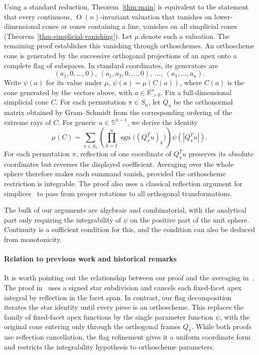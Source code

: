 \documentclass[11pt]{article}
\newcommand{\R}{\mathbb{R}}
\newcommand{\On}[1]{\operatorname{O}(#1)}
\newcommand{\sphere}[1]{\mathbb{S}^{#1}}
\DeclareMathOperator{\sgn}{sgn}
\begin{document}
Using a standard reduction, Theorem~\ref{thm:main} is equivalent 
to the statement that every continuous, $\On n$-invariant 
valuation that vanishes on lower-dimensional cones or cones containing a line, vanishes
on all simplicial cones (Theorem~\ref{thm:simplicial-vanishing}). Let $\mu$ denote such a valuation. The remaining proof establishes this
vanishing through orthoschemes.
An orthoscheme cone is generated by the successive orthogonal
projections of an apex onto a complete flag of subspaces. In standard
coordinates, its generators are
\[
 (a_1,0,\ldots,0),\ (a_1,a_2,0,\ldots,0),\ \ldots,\ (a_1,\ldots,a_n).
\]
Write $\psi(a)$ for its value under $\mu$, $\psi(a)=\mu(C(a))$, where $C(a)$ is the
cone generated by the vectors above, with $a\in\R_{>0}^n$. Fix a full-dimensional simplicial cone $C$.
For each permutation $\pi\in S_n$, let $Q_\pi$ be the orthonormal matrix
obtained by Gram--Schmidt from the corresponding ordering of the extreme
rays of $C$. For generic $u\in\sphere{n-1}$, we derive the identity
\begin{equation}\label{eq:intro-flag}
 \mu(C)=\sum_{\pi\in S_n}
 \left(\prod_{k=1}^n\sgn\bigl((Q_\pi^Tu)_k\bigr)\right)\psi(|Q_\pi^Tu|).
\end{equation}
For each permutation $\pi$, reflection of
one coordinate of $Q_\pi^Tu$ preserves its absolute coordinates but
reverses the displayed coefficient. Averaging over the whole sphere
therefore makes each summand vanish, provided the orthoscheme restriction
is integrable. The proof also uses a classical
reflection argument for simplices~\cite{Sah79:Hilberts-Third,KR97:Introduction-Geometric}
to pass from proper rotations to all orthogonal transformations.

The bulk of our arguments are algebraic and combinatorial, with 
the analytical part only requiring the integrability of $\psi$ on the positive part of the unit
sphere. Continuity is a sufficient condition for this, and the condition
can also be deduced from monotonicity.

\paragraph{Relation to previous work and historical remarks}
It is worth pointing out the relationship between our proof and 
the averaging in~\cite{WangWu:Spherical-Hadwiger,lotz2026monotoneinvariantvaluationsconvex}.
The proof in~\cite[Theorem~3.8]{lotz2026monotoneinvariantvaluationsconvex}
uses a signed star subdivision and cancels each fixed-facet apex integral
by reflection in the facet span. In contrast, our flag decomposition iterates the star
identity until every piece is an orthoscheme. This replaces the family of
fixed-facet apex functions by the single parameter function $\psi$, with
the original cone entering only through the orthogonal frames $Q_\pi$.
While both proofs use reflection cancellation, the flag refinement gives it a
uniform coordinate form and restricts the integrability hypothesis to
orthoscheme parameters.
\end{document}
